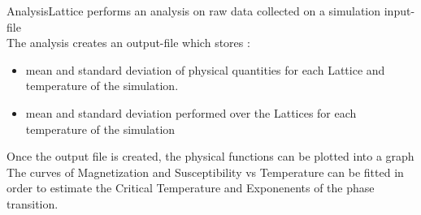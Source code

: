 AnalysisLattice performs an analysis on raw data collected on a simulation input-file \\ 
The analysis creates an output-file which stores : 
\begin{itemize}
	\item[] mean and standard deviation of physical quantities for each Lattice and temperature of the
	 		simulation.
	\item[] mean and standard deviation performed over the Lattices for each temperature of the simulation 	 		
	 		 
\end{itemize}
Once the output file is created, the physical functions can be plotted into a graph \\
The curves of Magnetization and Susceptibility vs Temperature can be fitted in order to estimate the Critical Temperature and Exponenents of the phase transition.


